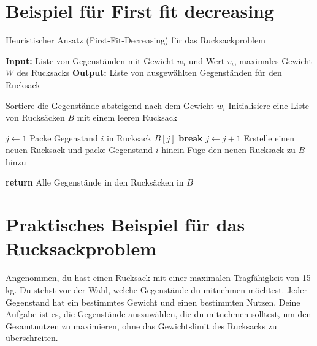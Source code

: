 \documentclass[12pt]{report}
\begin{document}
\section{Beispiel für First fit decreasing}
\begin{algorithm}
	\caption{Heuristischer Ansatz (First-Fit-Decreasing) für das Rucksackproblem}
	\begin{algorithmic}[1]
		\State \textbf{Input:} Liste von Gegenständen mit Gewicht $w_i$ und Wert $v_i$, maximales Gewicht $W$ des Rucksacks
		\State \textbf{Output:} Liste von ausgewählten Gegenständen für den Rucksack
		
		\State Sortiere die Gegenstände absteigend nach dem Gewicht $w_i$
		\State Initialisiere eine Liste von Rucksäcken $B$ mit einem leeren Rucksack
		
		\State $j \gets 1$
		\State Packe Gegenstand $i$ in Rucksack $B[j]$
		\State \textbf{break}
		\EndIf
		\State $j \gets j + 1$
		\EndWhile
		\State Erstelle einen neuen Rucksack und packe Gegenstand $i$ hinein
		\State Füge den neuen Rucksack zu $B$ hinzu
		\EndIf
		\EndFor
		
		\State \textbf{return} Alle Gegenstände in den Rucksäcken in $B$
	\end{algorithmic}
\end{algorithm}



\pagebreak
\section{Praktisches Beispiel für das Rucksackproblem}
Angenommen, du hast einen Rucksack mit einer maximalen Tragfähigkeit von 15 kg. Du stehst vor der Wahl, welche Gegenstände du mitnehmen möchtest. Jeder Gegenstand hat ein bestimmtes Gewicht und einen bestimmten Nutzen. Deine Aufgabe ist es, die Gegenstände auszuwählen, die du mitnehmen solltest, um den Gesamtnutzen zu maximieren, ohne das Gewichtslimit des Rucksacks zu überschreiten.
\end{document}
